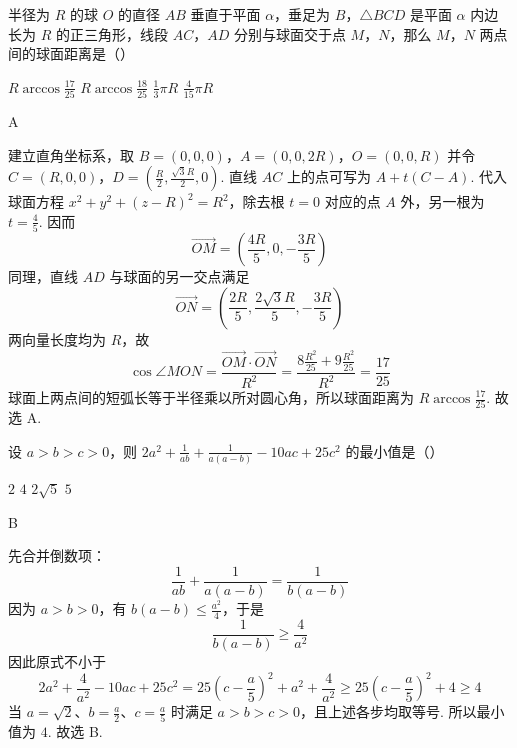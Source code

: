 \begin{problem}
半径为 \(R\) 的球 \(O\) 的直径 \(AB\) 垂直于平面 \(\alpha\)，垂足为 \(B\)，\(\triangle BCD\) 是平面 \(\alpha\) 内边长为 \(R\) 的正三角形，线段 \(AC\)，\(AD\) 分别与球面交于点 \(M\)，\(N\)，那么 \(M\)，\(N\) 两点间的球面距离是（\quad）


\choices
    {\(R\arccos \frac{17}{25}\)}
    {\(R\arccos \frac{18}{25}\)}
    {\(\frac{1}{3}\pi R\)}
    {\(\frac{4}{15}\pi R\)}
\end{problem}

\begin{answer}
A
\end{answer}

\begin{solution}
建立直角坐标系，取
\(B=(0,0,0)\)，\(A=(0,0,2R)\)，\(O=(0,0,R)\)
并令
\(C=(R,0,0)\)，\(D=\left(\frac R2,\frac{\sqrt3 R}{2},0\right)\).
直线 \(AC\) 上的点可写为 \(A+t(C-A)\). 代入球面方程
\(x^2+y^2+(z-R)^2=R^2\)，除去根 \(t=0\) 对应的点 \(A\) 外，另一根为 \(t=\frac45\). 因而
\[
\overrightarrow{OM}=\left(\frac{4R}{5},0,-\frac{3R}{5}\right)
\]
同理，直线 \(AD\) 与球面的另一交点满足
\[
\overrightarrow{ON}=\left(\frac{2R}{5},\frac{2\sqrt3 R}{5},-\frac{3R}{5}\right)
\]
两向量长度均为 \(R\)，故
\[
\cos\angle MON
=\frac{\overrightarrow{OM}\cdot\overrightarrow{ON}}{R^2}
=\frac{8\frac{R^2}{25}+9\frac{R^2}{25}}{R^2}
=\frac{17}{25}
\]
球面上两点间的短弧长等于半径乘以所对圆心角，所以球面距离为 \(R\arccos\frac{17}{25}\).
故选 A.
\end{solution}

\begin{problem}
设 \(a > b > c > 0\)，则 \(2a^2 + \frac{1}{ab} + \frac{1}{a(a - b)} - 10ac + 25c^2\) 的最小值是（\quad）

\choices
    {\(2\)}
    {\(4\)}
    {\(2\sqrt{5}\)}
    {\(5\)}
\end{problem}

\begin{answer}
B
\end{answer}

\begin{solution}
先合并倒数项：
\[
\frac1{ab}+\frac1{a(a-b)}=\frac1{b(a-b)}
\]
因为 \(a>b>0\)，有 \(b(a-b)\leq\frac{a^2}{4}\)，于是
\[
\frac1{b(a-b)}\geq\frac4{a^2}
\]
因此原式不小于
\[
2a^2+\frac4{a^2}-10ac+25c^2
=25\left(c-\frac a5\right)^2+a^2+\frac4{a^2}
\geq25\left(c-\frac a5\right)^2+4\geq4
\]
当 \(a=\sqrt2\)、\(b=\frac a2\)、\(c=\frac a5\) 时满足 \(a>b>c>0\)，且上述各步均取等号. 所以最小值为 \(4\).
故选 B.
\end{solution}

